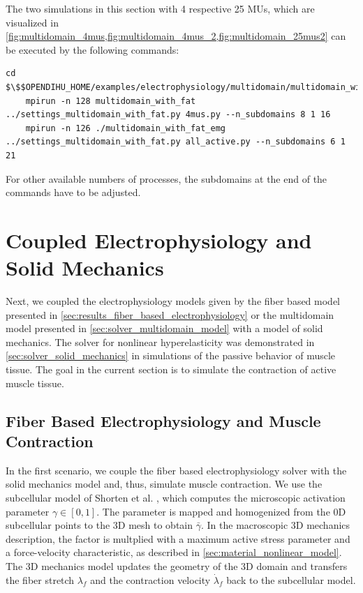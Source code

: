 \begin{reproduce_no_break}
  The two simulations in this section with 4 respective 25 MUs, which are visualized in \cref{fig:multidomain_4mus,fig:multidomain_4mus_2,fig:multidomain_25mus2} can be executed by the following commands:
  \begin{lstlisting}[columns=fullflexible,breaklines=true,postbreak=\mbox{\textcolor{gray}{$\hookrightarrow$}\space}]
    cd $\$$OPENDIHU_HOME/examples/electrophysiology/multidomain/multidomain_with_fat/build_release
    mpirun -n 128 multidomain_with_fat ../settings_multidomain_with_fat.py 4mus.py --n_subdomains 8 1 16
    mpirun -n 126 ./multidomain_with_fat_emg ../settings_multidomain_with_fat.py all_active.py --n_subdomains 6 1 21
  \end{lstlisting}
  For other available numbers of processes, the subdomains at the end of the commands have to be adjusted.
\end{reproduce_no_break}

\fi


\section{Coupled Electrophysiology and Solid Mechanics}

Next, we coupled the electrophysiology models given by the fiber based model presented in \cref{sec:results_fiber_based_electrophysiology} or the multidomain model presented in \cref{sec:solver_multidomain_model} with a model of solid mechanics. The solver for nonlinear hyperelasticity was demonstrated in \cref{sec:solver_solid_mechanics} in simulations of the passive behavior of muscle tissue. The goal in the current section is to simulate the contraction of active muscle tissue.

\subsection{Fiber Based Electrophysiology and Muscle Contraction}

In the first scenario, we couple the fiber based electrophysiology solver with the solid mechanics model and, thus, simulate muscle contraction.
We use the subcellular model of Shorten et al. \cite{Shorten2007}, which computes the microscopic activation parameter $\gamma \in [0,1]$. The parameter is mapped and homogenized from the 0D subcellular points to the 3D mesh to obtain $\bar{\gamma}$. In the macroscopic 3D mechanics description, the factor is multplied with a maximum active stress parameter and a force-velocity characteristic, as described in \cref{sec:material_nonlinear_model}.
The 3D mechanics model updates the geometry of the 3D domain and transfers the fiber stretch $\lambda_f$ and the contraction velocity $\dot{\lambda}_f$ back to the subcellular model.

